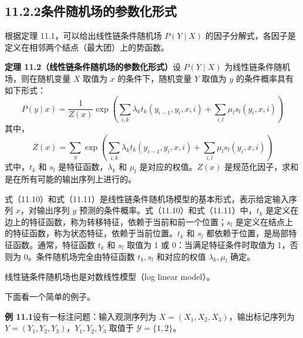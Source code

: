 \documentclass[UTF8, 12pt, fontset=fandol, oneside]{ctexart}
\begin{document}
\subsection*{11.2.2\quad 条件随机场的参数化形式}

根据定理 11.1，可以给出线性链条件随机场 $P(Y\mid X)$ 的因子分解式，各因子是定义在相邻两个结点（最大团）上的势函数。

\noindent\textbf{定理 11.2（线性链条件随机场的参数化形式）}\quad 设 $P(Y\mid X)$ 为线性链条件随机场，则在随机变量 $X$ 取值为 $x$ 的条件下，随机变量 $Y$ 取值为 $y$ 的条件概率具有如下形式：
\begin{equation}
P(y\mid x)=\frac{1}{Z(x)}\exp\left(
\sum_{i,k}\lambda_k t_k(y_{i-1},y_i,x,i)+
\sum_{i,l}\mu_l s_l(y_i,x,i)
\right)
\tag{11.10}
\end{equation}
其中，
\begin{equation}
Z(x)=\sum_y\exp\left(
\sum_{i,k}\lambda_k t_k(y_{i-1},y_i,x,i)+
\sum_{i,l}\mu_l s_l(y_i,x,i)
\right)
\tag{11.11}
\end{equation}
式中，$t_k$ 和 $s_l$ 是特征函数，$\lambda_k$ 和 $\mu_l$ 是对应的权值。$Z(x)$ 是规范化因子，求和是在所有可能的输出序列上进行的。

式（11.10）和式（11.11）是线性链条件随机场模型的基本形式，表示给定输入序列 $x$，对输出序列 $y$ 预测的条件概率。式（11.10）和式（11.11）中，$t_k$ 是定义在边上的特征函数，称为转移特征，依赖于当前和前一个位置；$s_l$ 是定义在结点上的特征函数，称为状态特征，依赖于当前位置。$t_k$ 和 $s_l$ 都依赖于位置，是局部特征函数。通常，特征函数 $t_k$ 和 $s_l$ 取值为 1 或 0：当满足特征条件时取值为 1，否则为 0。条件随机场完全由特征函数 $t_k,s_l$ 和对应的权值 $\lambda_k,\mu_l$ 确定。

线性链条件随机场也是对数线性模型（log linear model）。

下面看一个简单的例子。

\noindent\textbf{例 11.1}\quad 设有一标注问题：输入观测序列为 $X=(X_1,X_2,X_3)$，输出标记序列为 $Y=(Y_1,Y_2,Y_3)$，$Y_1,Y_2,Y_3$ 取值于 $\mathcal{Y}=\{1,2\}$。
\end{document}
